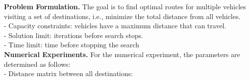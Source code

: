 \documentclass[10pt,bezier]{article}
\begin{document}
\textbf{Problem Formulation.}
 The goal is to find optimal routes for multiple vehicles visiting a set of destinations, i.e., minimize the total distance from all vehicles.\\

 \noindent - Capacity constraints: vehicles have a maximum distance that can travel.\\
 - Solution limit: iterations before search stops.\\
 - Time limit: time before stopping the search\\

\textbf{Numerical Experiments.}
For the numerical experiment, the parameters are determined as follows:\\

- Distance matrix between all destinations:
\end{document}
